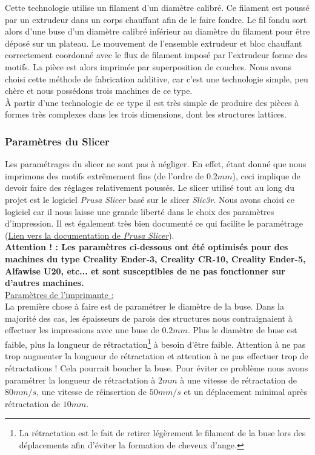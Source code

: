 \documentclass[a4paper]{article}
\begin{document}
	Cette technologie utilise un filament d’un diamètre calibré. Ce filament est poussé par un extrudeur dans un corps chauffant afin de le faire fondre. Le fil fondu sort alors d’une buse d’un diamètre calibré inférieur au diamètre du filament pour être déposé sur un plateau. Le mouvement de l’ensemble extrudeur et bloc chauffant correctement coordonné avec le flux de filament imposé par l’extrudeur forme des motifs. La pièce est alors imprimée par superposition de couches. Nous avons choisi cette méthode de fabrication additive, car c’est une technologie simple, peu chère et nous possédons trois machines de ce type.\\
	
	À partir d’une technologie de ce type il est très simple de produire des pièces à formes très complexes dans les trois dimensions, dont les structures lattices.
	\newpage
	
	\subsubsection{Paramètres du Slicer}
	\hspace{0.5cm}Les paramétrages du slicer ne sont pas à négliger. En effet, étant donné que nous imprimons des motifs extrêmement fins (de l'ordre de $0.2 mm$), ceci implique de devoir faire des réglages relativement poussés. Le slicer utilisé tout au long du projet est le logiciel \textit{Prusa Slicer} basé sur le slicer \textit{Slic3r}. Nous avons choisi ce logiciel car il nous laisse une grande liberté dans le choix des paramètres d'impression. Il est également très bien documenté ce qui facilite le paramétrage (\href{https://help.prusa3d.com/fr/category/prusaslicer_204}{Lien vers la documentation de \textit{Prusa Slicer}}).\\
	
	\textbf{Attention ! : Les paramètres ci-dessous ont été optimisés pour des machines du type Creality Ender-3, Creality CR-10, Creality Ender-5, Alfawise U20, etc... et sont susceptibles de ne pas fonctionner sur d'autres machines.}\\
	
	\underline{Paramètres de l'imprimante :}\\
	
	La première chose à faire est de paramétrer le diamètre de la buse. Dans la majorité des cas, les épaisseurs de parois des structures nous contraignaient à effectuer les impressions avec une buse de $0.2 mm$. Plus le diamètre de buse est faible, plus la longueur de rétractation\footnote{La rétractation est le fait de retirer légèrement le filament de la buse lors des déplacements afin d'éviter la formation de cheveux d'ange.} à besoin d'être faible. Attention à ne pas trop augmenter la longueur de rétractation et attention à ne pas effectuer trop de rétractations ! Cela pourrait boucher la buse. Pour éviter ce problème nous avons paramétrer la longueur de rétractation à $2 mm$ à une vitesse de rétractation de $80 mm/s$, une vitesse de réinsertion de $50 mm/s$ et un déplacement minimal après rétractation de $10 mm$.
	
\end{document}

